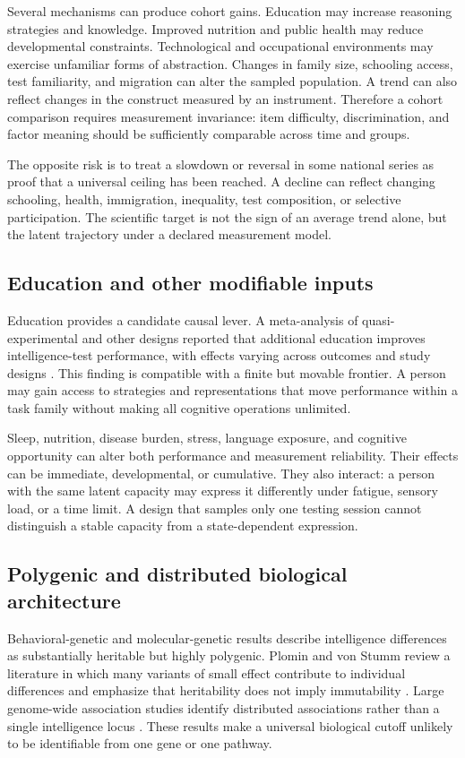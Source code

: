 \documentclass[conference]{IEEEtran}
\begin{document}
Several mechanisms can produce cohort gains. Education may increase reasoning strategies and knowledge. Improved nutrition and public health may reduce developmental constraints. Technological and occupational environments may exercise unfamiliar forms of abstraction. Changes in family size, schooling access, test familiarity, and migration can alter the sampled population. A trend can also reflect changes in the construct measured by an instrument. Therefore a cohort comparison requires measurement invariance: item difficulty, discrimination, and factor meaning should be sufficiently comparable across time and groups.

The opposite risk is to treat a slowdown or reversal in some national series as proof that a universal ceiling has been reached. A decline can reflect changing schooling, health, immigration, inequality, test composition, or selective participation. The scientific target is not the sign of an average trend alone, but the latent trajectory under a declared measurement model.

\subsection{Education and other modifiable inputs}
Education provides a candidate causal lever. A meta-analysis of quasi-experimental and other designs reported that additional education improves intelligence-test performance, with effects varying across outcomes and study designs \cite{ritchie2018}. This finding is compatible with a finite but movable frontier. A person may gain access to strategies and representations that move performance within a task family without making all cognitive operations unlimited.

Sleep, nutrition, disease burden, stress, language exposure, and cognitive opportunity can alter both performance and measurement reliability. Their effects can be immediate, developmental, or cumulative. They also interact: a person with the same latent capacity may express it differently under fatigue, sensory load, or a time limit. A design that samples only one testing session cannot distinguish a stable capacity from a state-dependent expression.

\subsection{Polygenic and distributed biological architecture}
Behavioral-genetic and molecular-genetic results describe intelligence differences as substantially heritable but highly polygenic. Plomin and von Stumm review a literature in which many variants of small effect contribute to individual differences and emphasize that heritability does not imply immutability \cite{plomin2018}. Large genome-wide association studies identify distributed associations rather than a single intelligence locus \cite{savage2018}. These results make a universal biological cutoff unlikely to be identifiable from one gene or one pathway.
\end{document}
